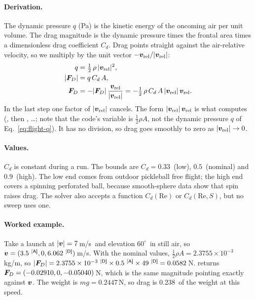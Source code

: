 \paragraph{Derivation.}
The dynamic pressure $q$ (\unit{Pa}) is the kinetic energy of the oncoming air per unit volume.
The drag magnitude is the dynamic pressure times the frontal area times a dimensionless drag coefficient
$C_d$.
Drag points straight against the air-relative velocity, so we multiply by the unit vector
$-\bm{v}_{\mathrm{rel}}/|\bm{v}_{\mathrm{rel}}|$:
\begin{align}
  q &= \tfrac12\,\rho\,|\bm{v}_{\mathrm{rel}}|^2, \label{eq:flight-q}\\
  |\bm{F}_D| &= q\,C_d\,A, \label{eq:flight-FDmag}\\
  \bm{F}_D &= -|\bm{F}_D|\,\frac{\bm{v}_{\mathrm{rel}}}{|\bm{v}_{\mathrm{rel}}|}
             = -\tfrac12\,\rho\,C_d\,A\,|\bm{v}_{\mathrm{rel}}|\,\bm{v}_{\mathrm{rel}}. \label{eq:flight-drag}
\end{align}
In the last step one factor of $|\bm{v}_{\mathrm{rel}}|$ cancels.
The form $|\bm{v}_{\mathrm{rel}}|\,\bm{v}_{\mathrm{rel}}$ is what  computes
(, then , \dots; note that the code's variable  is
$\tfrac12\rho A$, not the dynamic pressure $q$ of Eq.~\eqref{eq:flight-q}).
It has no division, so drag goes smoothly to zero as $|\bm{v}_{\mathrm{rel}}|\to 0$.

\paragraph{Values.}
$C_d$ is constant during a run.
The bounds are $C_d = 0.33$\assumed\ (low), $0.5$\assumed\ (nominal) and $0.9$\assumed\ (high).
The low end comes from outdoor pickleball free flight; the high end covers a spinning perforated ball,
because smooth-sphere data show that spin raises drag.
The solver also accepts a function $C_d(\mathrm{Re})$ or $C_d(\mathrm{Re},S)$, but no sweep uses one.

\paragraph{Worked example.}
Take a launch at $|\bm{v}| = 7$\,\unit{m/s}\assumed\ and elevation $60^\circ$\assumed\ in still air,
so $\vect{v} = (3.5\assumed, 0, 6.062\derived)$\,\unit{m/s}.
With the nominal values, $\tfrac12\rho A = 2.3755\times10^{-3}$\,\unit{kg/m}\derived, so
$|\vect{F}_D| = 2.3755\times10^{-3}\derived \times 0.5\assumed \times 49\derived = 0.0582$\,\unit{N}\derived.
 returns $\bm{F}_D = (-0.02910, 0, -0.05040)$\,\unit{N}\predicted, which is the
same magnitude pointing exactly against $\bm{v}$.
The weight is $mg = 0.2447$\,\unit{N}\derived, so drag is $0.238$\derived\ of the weight at this speed.

